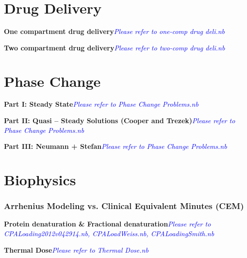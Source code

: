 \begin{appendices}
\section{Drug Delivery}
\begin{example}
\textbf{One compartment drug delivery}\textcolor{blue} {\emph{Please refer to one-comp drug deli.nb}}
\end{example}

\begin{example}
\textbf{Two compartment drug delivery}\textcolor{blue} {\emph{Please refer to two-comp drug deli.nb}}
\end{example}

\section{Phase Change}
\begin{example}
\textbf{Part I: Steady State}\textcolor{blue} {\emph{Please refer to Phase Change Problems.nb}}
\end{example}

\begin{example}
\textbf{Part II: Quasi – Steady Solutions (Cooper and Trezek)}\textcolor{blue} {\emph{Please refer to Phase Change Problems.nb}}
\end{example}

\begin{example}
\textbf{Part III:  Neumann + Stefan}\textcolor{blue} {\emph{Please refer to Phase Change Problems.nb}}
\end{example}

\section{Biophysics}
\subsubsection{Arrhenius Modeling vs. Clinical Equivalent Minutes (CEM)}
\begin{example}
\textbf{Protein denaturation \& Fractional denaturation}\textcolor{blue} {\emph{Please refer to CPALoading2012v042914.nb, CPALoadWeiss.nb, CPALoadingSmith.nb}}
\end{example}

\begin{example}
\textbf{Thermal Dose}\textcolor{blue} {\emph{Please refer to Thermal Dose.nb }}
\end{example}


\end{appendices}
